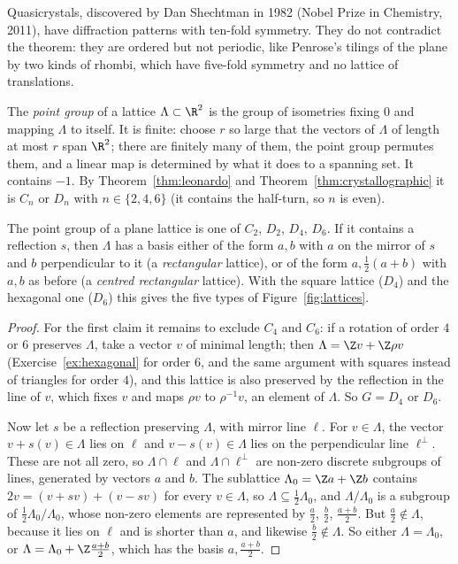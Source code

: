\begin{remark}
Quasicrystals, discovered by Dan Shechtman in 1982 (Nobel Prize in Chemistry, 2011), have diffraction patterns with ten-fold symmetry. They
do not contradict the theorem: they are ordered but not periodic, like Penrose's tilings of the plane by two kinds of rhombi, which have
five-fold symmetry and no lattice of translations.
\end{remark}

The \emph{point group} of a lattice $\Lambda\subset\R^2$ is the group of isometries fixing $0$ and mapping $\Lambda$ to itself. It is
finite: choose $r$ so large that the vectors of $\Lambda$ of length at most $r$ span $\R^2$; there are finitely many of them, the
point group permutes them, and a linear map is determined by what it does to a spanning set. It contains $-1$. By
Theorem~\ref{thm:leonardo} and Theorem~\ref{thm:crystallographic} it is $C_n$ or $D_n$ with $n\in\{2,4,6\}$ (it contains the half-turn,
so $n$ is even).

\begin{proposition}\label{prop:fivelattices}
The point group of a plane lattice is one of $C_2$, $D_2$, $D_4$, $D_6$. If it contains a reflection $s$, then $\Lambda$ has a basis
either of the form $a,b$ with $a$ on the mirror of $s$ and $b$ perpendicular to it (a \emph{rectangular} lattice), or of the form
$a,\frac12(a+b)$ with $a,b$ as before (a \emph{centred rectangular} lattice). With the square lattice ($D_4$) and the hexagonal one ($D_6$)
this gives the five types of Figure~\ref{fig:lattices}.
\end{proposition}
\begin{proof}
For the first claim it remains to exclude $C_4$ and $C_6$: if a rotation of order $4$ or $6$ preserves $\Lambda$, take a vector $v$ of
minimal length; then $\Lambda=\Z v+\Z\rho v$ (Exercise~\ref{ex:hexagonal} for order $6$, and the same argument with squares instead of triangles for
order $4$), and this lattice is also preserved by the reflection in the line of $v$, which fixes $v$ and maps $\rho v$ to
$\rho^{-1}v$, an element of $\Lambda$. So $G=D_4$ or $D_6$.

Now let $s$ be a reflection preserving $\Lambda$, with mirror line $\ell$. For $v\in\Lambda$, the vector $v+s(v)\in\Lambda$ lies on $\ell$
and $v-s(v)\in\Lambda$ lies on the perpendicular line $\ell^\perp$. These are not all zero, so $\Lambda\cap\ell$ and $\Lambda\cap\ell^\perp$
are non-zero discrete subgroups of lines, generated by vectors $a$ and $b$. The sublattice $\Lambda_0=\Z a+\Z b$ contains $2v=(v+sv)+(v-sv)$
for every $v\in\Lambda$, so $\Lambda\subseteq\frac12\Lambda_0$, and $\Lambda/\Lambda_0$ is a subgroup of $\frac12\Lambda_0/\Lambda_0$, whose
non-zero elements are represented by $\frac a2$, $\frac b2$, $\frac{a+b}2$. But $\frac a2\notin\Lambda$, because it lies on $\ell$ and is
shorter than $a$, and likewise $\frac b2\notin\Lambda$. So either $\Lambda=\Lambda_0$, or $\Lambda=\Lambda_0+\Z\frac{a+b}2$, which has the
basis $a,\frac{a+b}2$.
\end{proof}

